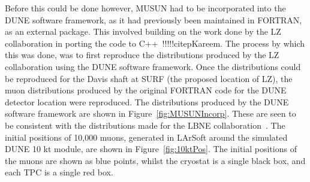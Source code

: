 Before this could be done however, MUSUN had to be incorporated into the DUNE software framework, as it had previously been maintained in FORTRAN, as an external package. This involved building on the work done by the LZ collaboration in porting the code to C++~!!!!!citep{Kareem}. The process by which this was done, was to first reproduce the distributions produced by the LZ collaboration using the DUNE software framework. Once the distributions could be reproduced for the Davis shaft at SURF (the proposed location of LZ), the muon distributions produced by the original FORTRAN code for the DUNE detector location were reproduced. The distributions produced by the DUNE software framework are shown in Figure~\ref{fig:MUSUNIncorp}. These are seen to be consistent with the distributions made for the LBNE collaboration~\citep{MUSUNLBNE}. The initial positions of 10,000 muons, generated in LArSoft around the simulated DUNE 10 kt module, are shown in Figure~\ref{fig:10ktPos}. The initial positions of the muons are shown as blue points, whilst the cryostat is a single black box, and each TPC is a single red box. \\

